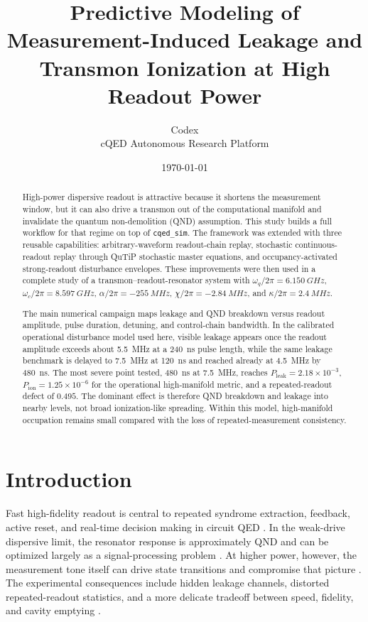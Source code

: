 \documentclass[11pt, a4paper]{article}
\title{\textbf{Predictive Modeling of Measurement-Induced Leakage and Transmon Ionization at High Readout Power}}
\author{Codex \\ cQED Autonomous Research Platform}
\date{\today}
\begin{document}
\maketitle

\begin{abstract}
High-power dispersive readout is attractive because it shortens the measurement window, but it can also drive a transmon out of the computational manifold and invalidate the quantum non-demolition (QND) assumption. This study builds a full workflow for that regime on top of \texttt{cqed\_sim}. The framework was extended with three reusable capabilities: arbitrary-waveform readout-chain replay, stochastic continuous-readout replay through QuTiP stochastic master equations, and occupancy-activated strong-readout disturbance envelopes. These improvements were then used in a complete study of a transmon--readout-resonator system with
$\omega_q/2\pi=\SI{6.150}{GHz}$,
$\omega_c/2\pi=\SI{8.597}{GHz}$,
$\alpha/2\pi=\SI{-255}{MHz}$,
$\chi/2\pi=\SI{-2.84}{MHz}$,
and $\kappa/2\pi=\SI{2.4}{MHz}$.

The main numerical campaign maps leakage and QND breakdown versus readout amplitude, pulse duration, detuning, and control-chain bandwidth. In the calibrated operational disturbance model used here, visible leakage appears once the readout amplitude exceeds about \SI{5.5}{MHz} at a \SI{240}{ns} pulse length, while the same leakage benchmark is delayed to \SI{7.5}{MHz} at \SI{120}{ns} and reached already at \SI{4.5}{MHz} by \SI{480}{ns}. The most severe point tested, \SI{480}{ns} at \SI{7.5}{MHz}, reaches
$P_{\mathrm{leak}}=2.18\times 10^{-3}$,
$P_{\mathrm{ion}}=1.25\times 10^{-6}$
for the operational high-manifold metric,
and a repeated-readout defect of $0.495$.
The dominant effect is therefore QND breakdown and leakage into nearby levels, not broad ionization-like spreading. Within this model, high-manifold occupation remains small compared with the loss of repeated-measurement consistency.
\end{abstract}

\section{Introduction}
Fast high-fidelity readout is central to repeated syndrome extraction, feedback, active reset, and real-time decision making in circuit QED \cite{blais2021circuit,koch2007transmon}. In the weak-drive dispersive limit, the resonator response is approximately QND and can be optimized largely as a signal-processing problem \cite{gambetta2007protocols,boissonneault2009dispersive}. At higher power, however, the measurement tone itself can drive state transitions and compromise that picture \cite{sank2016measurement}. The experimental consequences include hidden leakage channels, distorted repeated-readout statistics, and a more delicate tradeoff between speed, fidelity, and cavity emptying \cite{jeffrey2014fast,mcclure2016rapid,walter2017rapid}.
\end{document}
